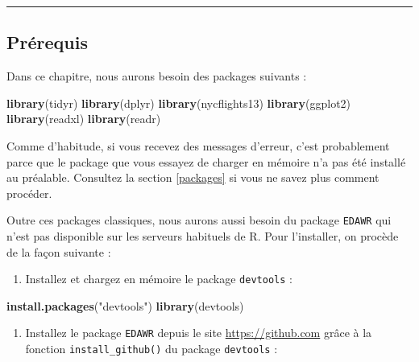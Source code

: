 \documentclass[a4paperpaper,]{article}
\newenvironment{Shaded}{\begin{snugshade}}{\end{snugshade}}
\newcommand{\KeywordTok}[1]{\textcolor[rgb]{0.12,0.11,0.11}{\textbf{#1}}}
\newcommand{\NormalTok}[1]{\textcolor[rgb]{0.12,0.11,0.11}{#1}}
\newcommand{\StringTok}[1]{\textcolor[rgb]{0.75,0.01,0.01}{#1}}
\providecommand{\tightlist}{%
  \setlength{\itemsep}{0pt}\setlength{\parskip}{0pt}}
\theoremstyle{definition}
\theoremstyle{definition}
\theoremstyle{definition}
\theoremstyle{remark}
\begin{document}
\begin{center}\rule{0.5\linewidth}{\linethickness}\end{center}

\hypertarget{prerek}{%
\subsection{Prérequis}\label{prerek}}

Dans ce chapitre, nous aurons besoin des packages suivants :

\begin{Shaded}
\begin{Highlighting}[]
\KeywordTok{library}\NormalTok{(tidyr)}
\KeywordTok{library}\NormalTok{(dplyr)}
\KeywordTok{library}\NormalTok{(nycflights13)}
\KeywordTok{library}\NormalTok{(ggplot2)}
\KeywordTok{library}\NormalTok{(readxl)}
\KeywordTok{library}\NormalTok{(readr)}
\end{Highlighting}
\end{Shaded}

Comme d'habitude, si vous recevez des messages d'erreur, c'est
probablement parce que le package que vous essayez de charger en mémoire
n'a pas été installé au préalable. Consultez la section \ref{packages}
si vous ne savez plus comment procéder.

Outre ces packages classiques, nous aurons aussi besoin du package
\texttt{EDAWR} qui n'est pas disponible sur les serveurs habituels de R.
Pour l'installer, on procède de la façon suivante :

\begin{enumerate}
\def\labelenumi{\arabic{enumi}.}
\tightlist
\item
  Installez et chargez en mémoire le package \texttt{devtools} :
\end{enumerate}

\begin{Shaded}
\begin{Highlighting}[]
\KeywordTok{install.packages}\NormalTok{(}\StringTok{"devtools"}\NormalTok{)}
\KeywordTok{library}\NormalTok{(devtools)}
\end{Highlighting}
\end{Shaded}

\begin{enumerate}
\def\labelenumi{\arabic{enumi}.}
\setcounter{enumi}{1}
\tightlist
\item
  Installez le package \texttt{EDAWR} depuis le site
  \url{https://github.com} grâce à la fonction
  \texttt{install\_github()} du package \texttt{devtools} :
\end{enumerate}
\end{document}
